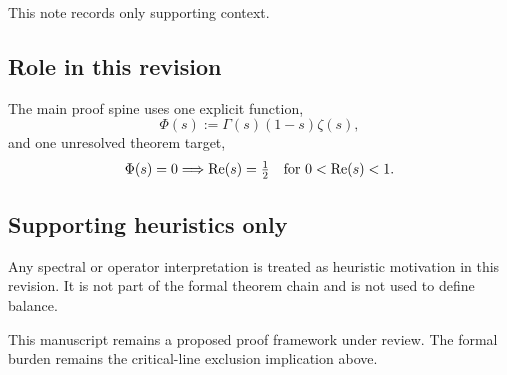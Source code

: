 This note records only supporting context.

\subsection*{Role in this revision}
The main proof spine uses one explicit function,
\[
\Phi(s):=\Gamma(s)(1-s)\zeta(s),
\]
and one unresolved theorem target,
\[
\Phi(s)=0\Longrightarrow\operatorname{Re}(s)=\tfrac12
\quad\text{for }0<\operatorname{Re}(s)<1.
\]

\subsection*{Supporting heuristics only}
Any spectral or operator interpretation is treated as heuristic motivation in this revision.
It is not part of the formal theorem chain and is not used to define balance.

\begin{remark}
This manuscript remains a proposed proof framework under review.
The formal burden remains the critical-line exclusion implication above.
\end{remark}
